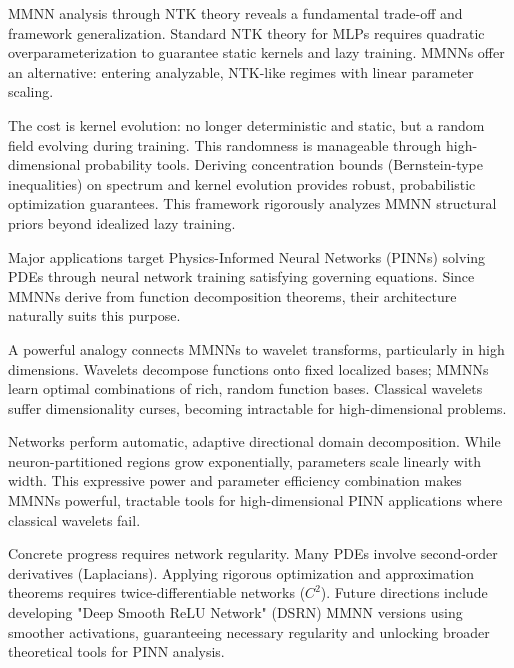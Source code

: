 \documentclass[a4paper]{article}
\theoremstyle{plain}
\theoremstyle{definition}
\theoremstyle{remark}
\begin{document}
\begin{tcolorbox}[colback=red!5,colframe=red!80!black,title={\textbf{Conclusion: A New Paradigm for NTK Analysis}},enhanced,drop shadow,boxrule=2pt]
MMNN analysis through NTK theory reveals a fundamental trade-off and framework generalization. Standard NTK theory for MLPs requires quadratic overparameterization to guarantee static kernels and lazy training. MMNNs offer an alternative: entering analyzable, NTK-like regimes with linear parameter scaling.

The cost is kernel evolution: no longer deterministic and static, but a random field evolving during training. This randomness is manageable through high-dimensional probability tools. Deriving concentration bounds (Bernstein-type inequalities) on spectrum and kernel evolution provides robust, probabilistic optimization guarantees. This framework rigorously analyzes MMNN structural priors beyond idealized lazy training.
\end{tcolorbox}

\begin{tcolorbox}[colback=red!5,colframe=red!80!black,title={\textbf{Outlook: PINNs Application and Wavelet Analogy}},enhanced,drop shadow,boxrule=2pt]
Major applications target Physics-Informed Neural Networks (PINNs) solving PDEs through neural network training satisfying governing equations. Since MMNNs derive from function decomposition theorems, their architecture naturally suits this purpose.

A powerful analogy connects MMNNs to wavelet transforms, particularly in high dimensions. Wavelets decompose functions onto fixed localized bases; MMNNs learn optimal combinations of rich, random function bases. Classical wavelets suffer dimensionality curses, becoming intractable for high-dimensional problems.

Networks perform automatic, adaptive directional domain decomposition. While neuron-partitioned regions grow exponentially, parameters scale linearly with width. This expressive power and parameter efficiency combination makes MMNNs powerful, tractable tools for high-dimensional PINN applications where classical wavelets fail.

Concrete progress requires network regularity. Many PDEs involve second-order derivatives (Laplacians). Applying rigorous optimization and approximation theorems requires twice-differentiable networks ($C^2$). Future directions include developing "Deep Smooth ReLU Network" (DSRN) MMNN versions using smoother activations, guaranteeing necessary regularity and unlocking broader theoretical tools for PINN analysis.
\end{tcolorbox}
\end{document}
